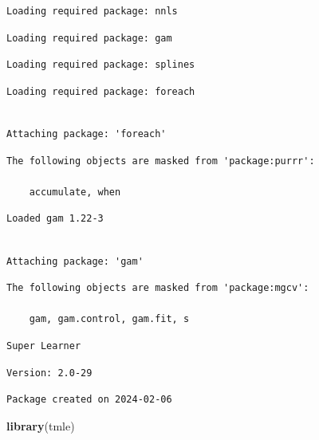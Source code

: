 \documentclass[
]{book}
\newenvironment{Shaded}{\begin{snugshade}}{\end{snugshade}}
\newcommand{\FunctionTok}[1]{\textcolor[rgb]{0.13,0.29,0.53}{\textbf{#1}}}
\newcommand{\NormalTok}[1]{#1}
\begin{document}
\begin{verbatim}
Loading required package: nnls
\end{verbatim}

\begin{verbatim}
Loading required package: gam
\end{verbatim}

\begin{verbatim}
Loading required package: splines
\end{verbatim}

\begin{verbatim}
Loading required package: foreach
\end{verbatim}

\begin{verbatim}

Attaching package: 'foreach'
\end{verbatim}

\begin{verbatim}
The following objects are masked from 'package:purrr':

    accumulate, when
\end{verbatim}

\begin{verbatim}
Loaded gam 1.22-3
\end{verbatim}

\begin{verbatim}

Attaching package: 'gam'
\end{verbatim}

\begin{verbatim}
The following objects are masked from 'package:mgcv':

    gam, gam.control, gam.fit, s
\end{verbatim}

\begin{verbatim}
Super Learner
\end{verbatim}

\begin{verbatim}
Version: 2.0-29
\end{verbatim}

\begin{verbatim}
Package created on 2024-02-06
\end{verbatim}

\begin{Shaded}
\begin{Highlighting}[]
\FunctionTok{library}\NormalTok{(tmle)}
\end{Highlighting}
\end{Shaded}
\end{document}
